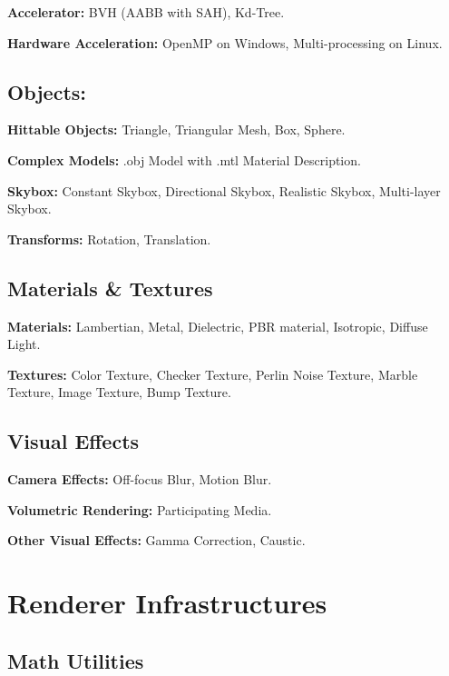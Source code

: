 \documentclass[utf8]{article}
\begin{document}
\noindent
\textbf{Accelerator: } BVH (AABB with SAH), Kd-Tree.

\noindent
\textbf{Hardware Acceleration: } OpenMP on Windows, Multi-processing on Linux.

\subsection{Objects: }
\noindent
\textbf{Hittable Objects: } Triangle, Triangular Mesh, Box, Sphere.

\noindent
\textbf{Complex Models: } .obj Model with .mtl Material Description.

\noindent
\textbf{Skybox: } Constant Skybox, Directional Skybox, Realistic Skybox, Multi-layer Skybox.

\noindent
\textbf{Transforms: } Rotation, Translation.

\subsection{Materials \& Textures}
\noindent
\textbf{Materials: } Lambertian, Metal, Dielectric, PBR material, Isotropic, Diffuse Light.

\noindent
\textbf{Textures: } Color Texture, Checker Texture, Perlin Noise Texture, Marble Texture, Image Texture, Bump Texture.

\subsection{Visual Effects}
\noindent
\textbf{Camera Effects: } Off-focus Blur, Motion Blur.

\noindent
\textbf{Volumetric Rendering: } Participating Media.

\noindent
\textbf{Other Visual Effects: } Gamma Correction, Caustic.

\section{Renderer Infrastructures}

\subsection{Math Utilities}
\end{document}
